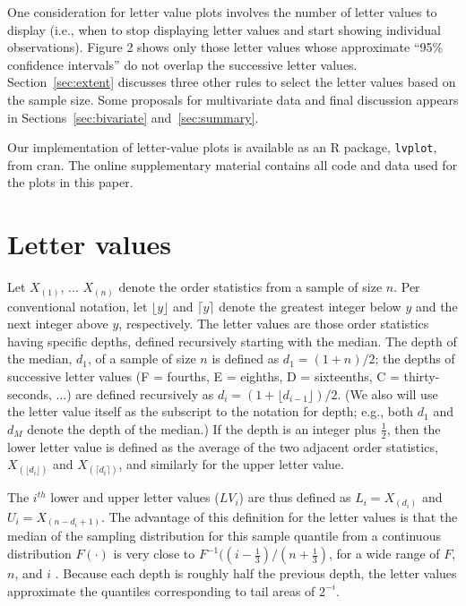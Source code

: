 \documentclass[12pt,oneside]{article}
\begin{document}
One consideration for letter value plots involves the number of letter values to display (i.e., when to stop displaying letter values and start showing individual observations). Figure 2 shows only those letter values whose approximate ``95\% confidence intervals'' do not overlap the successive letter values. Section~\ref{sec:extent} discusses three other rules to select the letter values based on the sample size. Some proposals for multivariate data and final discussion appears in Sections~\ref{sec:bivariate} and~\ref{sec:summary}.

Our implementation of letter-value plots is available as an R package, \texttt{lvplot}, from {\sc cran}. The online supplementary material contains all code and data used for the plots in this paper.

\section{Letter values}
\label{sec:letter-values}

Let $X_{(1)}$, ... $X_{(n)}$ denote the order statistics from a sample of size $n$. Per conventional notation, let $\lfloor y \rfloor$ and $\lceil y \rceil$ denote the greatest integer below $y$ and the next integer above $y$, respectively. The letter values are those order statistics having specific depths, defined recursively starting with the median. The depth of the median, $d_1$, of a sample of size $n$ is defined as $d_1 = (1 + n )/2$; the depths of successive letter values (F = fourths, E = eighths, D = sixteenths, C = thirty-seconds, ...) are defined recursively as $d_i = (1 + \lfloor d_{i-1} \rfloor)/2$. (We also will use the letter value itself as the subscript to the notation for depth; e.g., both $d_1$ and $d_M$ denote the depth of the median.) If the depth is an integer plus $\frac{1}{2}$, then the lower letter value is defined as the average of the two adjacent order statistics, $X_{(\lfloor d_i \rfloor)}$ and $X_{(\lceil d_i \rceil)}$, and similarly for the upper letter value.

The $i^{th}$ lower and upper letter values ($LV_i$) are thus defined as $L_i = X_{(d_i)}$ and $U_i = X_{(n - d_i + 1)}$. The advantage of this definition for the letter values is that the median of the sampling distribution for this sample quantile from a continuous distribution $F(\cdot)$ is very close to $F^{-1} ((i - \frac{1}{3})/(n + \frac{1}{3})$, for a wide range of $F$, $n$, and $i$ \citep{dchlv}. Because each depth is roughly half the previous depth, the letter values approximate the quantiles corresponding to tail areas of $2^{-i}$.
\end{document}
